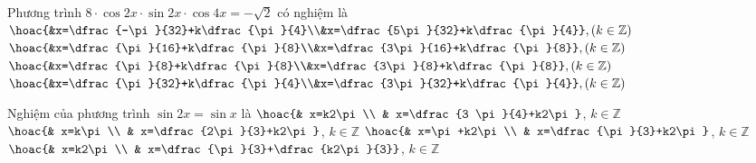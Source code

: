 \begin{ex}%
	Phương trình $8\cdot\cos 2x\cdot\sin 2x\cdot\cos 4x=-\sqrt{2}$ có  nghiệm là
	 \choice
		{\True  $\hoac{&x=\dfrac{-\pi}{32}+k\dfrac{\pi}{4}\\&x=\dfrac{5\pi}{32}+k\dfrac{\pi}{4}},(k\in\mathbb{Z})$}
		{$\hoac{&x=\dfrac{\pi}{16}+k\dfrac{\pi}{8}\\&x=\dfrac{3\pi}{16}+k\dfrac{\pi}{8}},(k\in\mathbb{Z})$} 
		 {$\hoac{&x=\dfrac{\pi}{8}+k\dfrac{\pi}{8}\\&x=\dfrac{3\pi}{8}+k\dfrac{\pi}{8}},(k\in\mathbb{Z})$}
		 {$\hoac{&x=\dfrac{\pi}{32}+k\dfrac{\pi}{4}\\&x=\dfrac{3\pi}{32}+k\dfrac{\pi}{4}},(k\in\mathbb{Z})$}
\end{ex}

\begin{ex}%
	Nghiệm của phương trình $\sin 2x=\sin  x$ là
	 \choice
		{$\hoac{& x=k2\pi  \\ & x=\dfrac{3 \pi}{4}+k2\pi}$, $k \in \mathbb{Z}$}
		{$\hoac{&  x=k\pi \\ & x=\dfrac{2\pi}{3}+k2\pi}$, $k \in \mathbb{Z}$}
		 {$\hoac{& x=\pi+k2\pi \\ & x=\dfrac{\pi}{3}+k2\pi}$, $k \in \mathbb{Z}$}
		{\True $\hoac{& x=k2\pi \\  & x=\dfrac{\pi}{3}+\dfrac{k2\pi}{3}}$, $k \in \mathbb{Z}$}
\end{ex}

